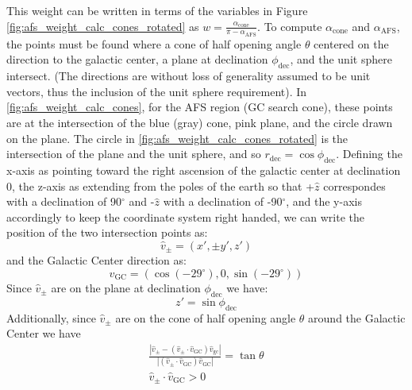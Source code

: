 This weight can be written in terms of the variables in Figure \ref{fig:afs_weight_calc_cones_rotated} as $w=\frac{\alpha_\textrm{cone}}{\pi-\alpha_\textrm{AFS}}$.  To compute $\alpha_\textrm{cone}$ and $\alpha_\textrm{AFS}$, the points must be found where a cone of half opening angle $\theta$ centered on the direction to the galactic center, a plane at declination $\phi_\textrm{dec}$, and the unit sphere intersect.  (The directions are without loss of generality assumed to be unit vectors, thus the inclusion of the unit sphere requirement).  In \cref{fig:afs_weight_calc_cones}, for the AFS region (GC search cone), these points are at the intersection of the blue (gray) cone, pink plane, and the circle drawn on the plane.  The circle in \cref{fig:afs_weight_calc_cones_rotated} is the intersection of the plane and the unit sphere, and so $r_\textrm{dec}=\cos \phi_\textrm{dec}$.  Defining the x-axis as pointing toward the right ascension of the galactic center at declination 0, the z-axis as extending from the poles of the earth so that +$\hat{z}$ correspondes with a declination of 90$^\circ$ and -$\hat{z}$ with a declination of -90$^\circ$, and the y-axis accordingly to keep the coordinate system right handed, we can write the position of the two intersection points as:
\begin{equation}
\hat{v}_\pm=(x',\pm y',z')
\end{equation} 
and the Galactic Center direction as:
\begin{equation}
\hat{v}_\textrm{GC}=(\cos (-29^\circ),0,\sin (-29^\circ))
\end{equation}
Since $\hat{v}_\pm$ are on the plane at declination $\phi_\textrm{dec}$ we have:
\begin{equation}
z'=\sin \phi_\textrm{dec}
\end{equation}
Additionally, since $\hat{v}_\pm$ are on the cone of half opening angle $\theta$ around the Galactic Center we have 
\begin{eqnarray}
\label{eq:cone_condition_1}
\frac{|\hat{v}_\pm-(\hat{v}_\pm \cdot \hat{v}_\textrm{GC})\hat{v}_\textrm{gc}|}{|(\hat{v}_\pm \cdot \hat{v}_\textrm{GC})\hat{v}_\textrm{GC}|}=\tan \theta
\\
\hat{v}_\pm \cdot \hat{v}_\textrm{GC}>0
\label{eq:cone_condition_2}
\end{eqnarray}


